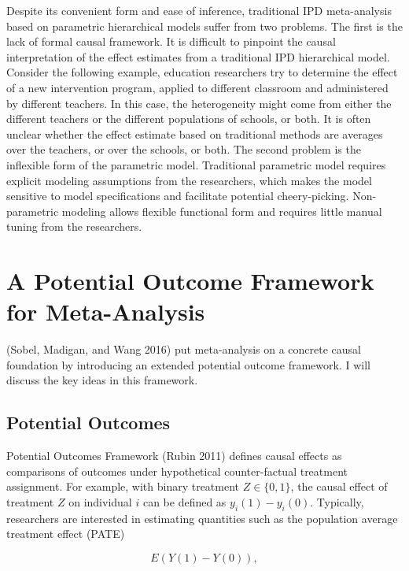 Despite its convenient form and ease of inference, traditional IPD
meta-analysis based on parametric hierarchical models suffer from two
problems. The first is the lack of formal causal framework. It is
difficult to pinpoint the causal interpretation of the effect estimates
from a traditional IPD hierarchical model. Consider the following
example, education researchers try to determine the effect of a new
intervention program, applied to different classroom and administered by
different teachers. In this case, the heterogeneity might come from
either the different teachers or the different populations of schools,
or both. It is often unclear whether the effect estimate based on
traditional methods are averages over the teachers, or over the schools,
or both. The second problem is the inflexible form of the parametric
model. Traditional parametric model requires explicit modeling
assumptions from the researchers, which makes the model sensitive to
model specifications and facilitate potential cheery-picking.
Non-parametric modeling allows flexible functional form and requires
little manual tuning from the researchers.

\section{A Potential Outcome Framework for
Meta-Analysis}\label{a-potential-outcome-framework-for-meta-analysis}

(Sobel, Madigan, and Wang 2016) put meta-analysis on a concrete causal
foundation by introducing an extended potential outcome framework. I
will discuss the key ideas in this framework.

\subsection{Potential Outcomes}\label{potential-outcomes}

Potential Outcomes Framework (Rubin 2011) defines causal effects as
comparisons of outcomes under hypothetical counter-factual treatment
assignment. For example, with binary treatment \(Z\in \{0,1\}\), the
causal effect of treatment \(Z\) on individual \(i\) can be defined as
\(y_i(1)-y_i(0)\). Typically, researchers are interested in estimating
quantities such as the population average treatment effect (PATE)

\begin{equation*} E(Y(1)-Y(0)), \end{equation*}

